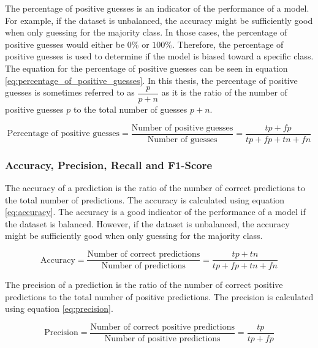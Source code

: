 The percentage of positive guesses is an indicator of the performance of a model. For example, if the dataset is unbalanced, the accuracy might be sufficiently good when only guessing for the majority class. In those cases, the percentage of positive guesses would either be $0\%$ or $100\%$. Therefore, the percentage of positive guesses is used to determine if the model is biased toward a specific class. The equation for the percentage of positive guesses can be seen in equation \ref{eq:percentage_of_positive_guesses}. In this thesis, the percentage of positive guesses is sometimes referred to as $\dfrac{p}{p + n}$ as it is the ratio of the number of positive guesses $p$ to the total number of guesses $p + n$.

\begin{equation}
    \label{eq:percentage_of_positive_guesses}
    \text{Percentage of positive guesses} = \frac{\text{Number of positive guesses}}{\text{Number of guesses}} = \frac{tp + fp}{tp + fp + tn + fn}
\end{equation}

\subsubsection{Accuracy, Precision, Recall and F1-Score}

The accuracy of a prediction is the ratio of the number of correct predictions to the total number of predictions. The accuracy is calculated using equation \ref{eq:accuracy}. The accuracy is a good indicator of the performance of a model if the dataset is balanced. However, if the dataset is unbalanced, the accuracy might be sufficiently good when only guessing for the majority class. 

\begin{equation}
    \label{eq:accuracy}
    \text{Accuracy} = \frac{\text{Number of correct predictions}}{\text{Number of predictions}} = \frac{tp + tn}{tp + fp + tn + fn}
\end{equation}

The precision of a prediction is the ratio of the number of correct positive predictions to the total number of positive predictions. The precision is calculated using equation \ref{eq:precision}.

\begin{equation}
    \label{eq:precision}
    \text{Precision} = \frac{\text{Number of correct positive predictions}}{\text{Number of positive predictions}} = \frac{tp}{tp + fp}
\end{equation}

